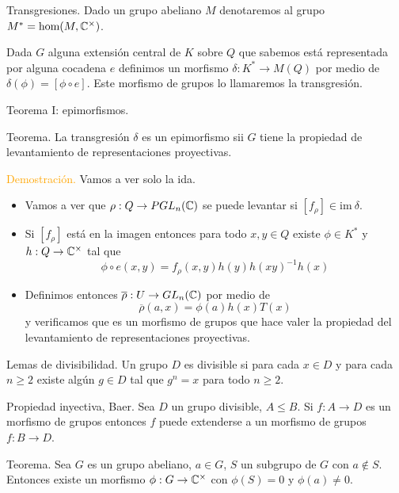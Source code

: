 \documentclass[aspectratio=169, 9pt]{beamer}
\begin{document}
\begin{frame}[fragile]{Transgresiones.}
Dado un grupo abeliano $M$ denotaremos al grupo $M^* = \text{hom}(M, \Bbb C^\times)$.
\pause
\bigskip


Dada $G$ alguna extensión central de $K$ sobre $Q$ que sabemos está representada por alguna cocadena $e$ definimos un morfismo $\delta: K^{*} \to M(Q)$ por medio de $\delta(\phi) = [\phi \circ e].$ Este morfismo de grupos lo llamaremos la \alert{transgresión}.
\end{frame}

\begin{frame}[fragile]{Teorema I: epimorfismos.}
\begin{alertblock}{Teorema.}
	La transgresión $\delta$ es un epimorfismo sii $G$ tiene la propiedad de levantamiento de representaciones proyectivas.
\end{alertblock}
\textcolor{orange}{Demostración.} Vamos a ver solo la ida.
\begin{itemize}
	\item Vamos a ver que $\rho:Q \to PGL_n(\Bbb C)$ se puede levantar si $[f_\rho] \in \text{im} \ \delta$.
	\pause
	\item Si $[f_\rho]$ está en la imagen entonces para todo $x,y \in Q$ existe $\phi \in K^*$ y $h:Q \to \Bbb C^\times$ tal que
	\begin{equation*}
		\phi \circ e (x,y) = f_\rho(x,y)h(y)h(xy)^{-1}h(x)
	\end{equation*}
	\pause
	\item Definimos entonces $\overline \rho:U \to GL_n(\Bbb C)$ por medio de
	\begin{equation*}
		\overline \rho(a,x) = \phi(a)h(x)T(x)
	\end{equation*}
	y verificamos que es un morfismo de grupos que hace valer la propiedad del levantamiento de representaciones proyectivas.
\end{itemize}
\end{frame}


\begin{frame}{Lemas de divisibilidad.}
	Un grupo $D$ es \alert{divisible} si para cada $x \in D$ y para cada $n \ge 2$ existe algún $g \in D$ tal que $g^n = x$ para todo $n \ge 2$. \pause
	\begin{alertblock}{Propiedad inyectiva, Baer.}
		Sea $D$ un grupo divisible, $A \le B$. Si $f:A \to D$ es un morfismo de grupos entonces $f$ puede extenderse a un morfismo de grupos $f:B \to D$.
	\end{alertblock}
	\begin{alertblock}{Teorema.}
	Sea $G$ es un grupo abeliano, $a \in G$, $S$ un subgrupo de $G$ con $a \notin S$. Entonces existe un morfismo $\phi:G \to \Bbb C^\times$ con $\phi(S)=0$ y $\phi(a) \neq 0$.
	\end{alertblock}
\end{frame}
\end{document}
